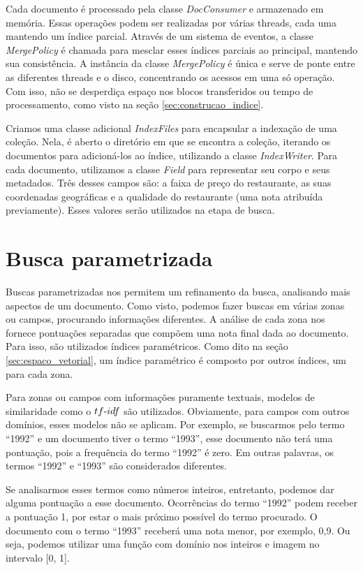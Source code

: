 Cada documento é processado pela classe \emph{DocConsumer} e armazenado em memória. Essas operações podem ser realizadas por várias threads, cada uma mantendo um índice parcial. Através de um sistema de eventos, a classe \emph{MergePolicy} é chamada para mesclar esses índices parciais ao principal, mantendo sua consistência. A instância da classe \emph{MergePolicy} é única e serve de ponte entre as diferentes threads e o disco, concentrando os acessos em uma só operação. Com isso, não se desperdiça espaço nos blocos transferidos ou tempo de processamento, como visto na seção \ref{sec:construcao_indice}. 

Criamos uma classe adicional \emph{IndexFiles} para encapsular a indexação de uma coleção. Nela, é aberto o diretório em que se encontra a coleção, iterando os documentos para adicioná-los ao índice, utilizando a classe \emph{IndexWriter}. Para cada documento, utilizamos a classe \emph{Field} para representar seu corpo e seus metadados. Três desses campos são: a faixa de preço do restaurante, as suas coordenadas geográficas e a qualidade do restaurante (uma nota atribuída previamente). Esses valores serão utilizados na etapa de busca.

\section{Busca parametrizada}
\label{sec:busca_parametrizada}

Buscas parametrizadas nos permitem um refinamento da busca, analisando mais aspectos de um documento. Como visto, podemos fazer buscas em várias zonas ou campos, procurando informações diferentes. A análise de cada zona nos fornece pontuações separadas que compõem uma nota final dada ao documento. Para isso, são utilizados índices paramétricos. Como dito na seção \ref{sec:espaco_vetorial}, um índice paramétrico é composto por outros índices, um para cada zona.

Para zonas ou campos com informações puramente textuais, modelos de similaridade como o $tf\textnormal{-}idf$ são utilizados. Obviamente, para campos com outros domínios, esses modelos não se aplicam. Por exemplo, se buscarmos pelo termo ``1992'' e um documento tiver o termo ``1993'', esse documento não terá uma pontuação, pois a frequência do termo ``1992'' é zero.  Em outras palavras, os termos ``1992'' e ``1993'' são considerados diferentes.

Se analisarmos esses termos como números inteiros, entretanto, podemos dar alguma pontuação a esse documento. Ocorrências do termo ``1992'' podem receber a pontuação 1, por estar o mais próximo possível do termo procurado. O documento com o termo ``1993'' receberá uma nota menor, por exemplo, 0,9. Ou seja, podemos utilizar uma função com domínio nos inteiros e imagem no intervalo [0, 1].

